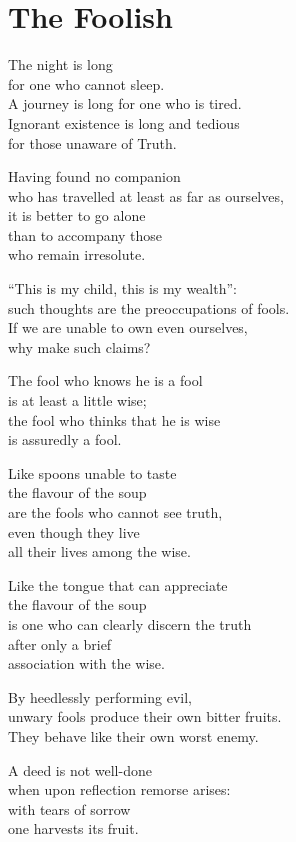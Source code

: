
\chapter{The Foolish}

The night is long\\
for one who cannot sleep.\\
A journey is long for one who is tired.\\
Ignorant existence is long and tedious\\
for those unaware of Truth.


Having found no companion\\
who has travelled at least as far as ourselves,\\
it is better to go alone\\
than to accompany those\\
who remain irresolute.


“This is my child, this is my wealth”:\\
such thoughts are the preoccupations of fools.\\
If we are unable to own even ourselves,\\
why make such claims?


The fool who knows he is a fool\\
is at least a little wise;\\
the fool who thinks that he is wise\\
is assuredly a fool.


Like spoons unable to taste\\
the flavour of the soup\\
are the fools who cannot see truth,\\
even though they live\\
all their lives among the wise.


Like the tongue that can appreciate\\
the flavour of the soup\\
is one who can clearly discern the truth\\
after only a brief\\
association with the wise.


By heedlessly performing evil,\\
unwary fools produce their own bitter fruits.\\
They behave like their own worst enemy.

A deed is not well-done\\
when upon reflection remorse arises:\\
with tears of sorrow\\
one harvests its fruit.


